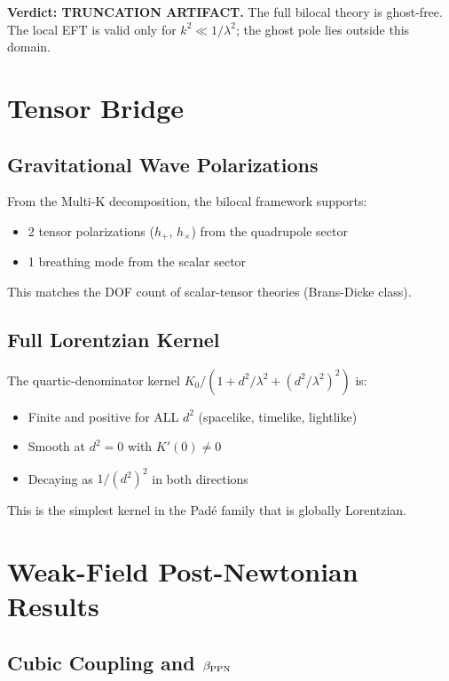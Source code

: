 \documentclass[12pt]{article}
\begin{document}
\textbf{Verdict: TRUNCATION ARTIFACT.} The full bilocal theory is ghost-free. The local EFT is valid only for $k^2 \ll 1/\lambda^2$; the ghost pole lies outside this domain.

\section{Tensor Bridge}
\label{sec:tensor}

\subsection{Gravitational Wave Polarizations}

From the Multi-K decomposition, the bilocal framework supports:
\begin{itemize}
\item 2 tensor polarizations ($h_+$, $h_\times$) from the quadrupole sector
\item 1 breathing mode from the scalar sector
\end{itemize}
This matches the DOF count of scalar-tensor theories (Brans-Dicke class).

\subsection{Full Lorentzian Kernel}

The quartic-denominator kernel $K_0/(1+d^2/\lambda^2+(d^2/\lambda^2)^2)$ is:
\begin{itemize}
\item Finite and positive for ALL $d^2$ (spacelike, timelike, lightlike)
\item Smooth at $d^2=0$ with $K'(0) \neq 0$
\item Decaying as $1/(d^2)^2$ in both directions
\end{itemize}
This is the simplest kernel in the Pad\'e family that is globally Lorentzian.

\section{Weak-Field Post-Newtonian Results}
\label{sec:ppn}

\subsection{Cubic Coupling and $\beta_{\rm PPN}$}
\end{document}
